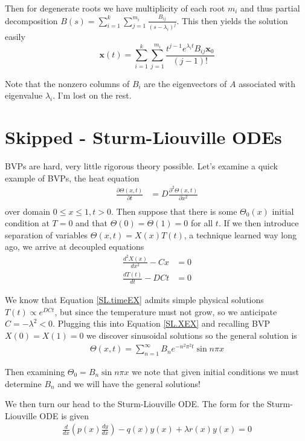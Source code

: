 \documentclass[10pt]{report}
\newcommand{\rtd}[2]{\frac{d^2#1}{d#2^2}}
\newcommand{\ptd}[2]{\frac{\partial^2 #1}{\partial#2^2}}
\newcommand{\rd}[2]{\frac{d#1}{d#2}}
\newcommand{\pd}[2]{\frac{\partial #1}{\partial#2}}
\begin{document}
Then for degenerate roots we have multiplicity of each root $m_{i}$ and thus partial decomposition $B(s) = \sum_{i=1}^k\sum_{j=1}^{m_i}\frac{B_{ij}}{(s-\lambda_i)^j}$. This then yields the solution easily
$$\mathbf{x}(t) = \sum_{i=1}^{k}\sum_{j=1}^{m_i}\frac{t^{j-1}e^{\lambda_it}B_{ij}\mathbf{x}_0}{(j-1)!}$$

Note that the nonzero columns of $B_i$ are the eigenvectors of $A$ associated with eigenvalue $\lambda_i$. I'm lost on the rest.
\chapter{Skipped - Sturm-Liouville ODEs}

BVPs are hard, very little rigorous theory possible. Let's examine a quick example of BVPs, the heat equation
\begin{align}
    \pd{\Theta(x,t)}{t} &= D\ptd{\Theta(x,t)}{x}\\
\end{align}
over domain $0\leq x\leq1, t > 0$. Then suppose that there is some $\Theta_0(x)$ initial condition at $T=0$ and that $\Theta(0) = \Theta(1) = 0$ for all $t$. If we then introduce separation of variables $\Theta(x,t) = X(x) T(t)$, a technique learned way long ago, we arrive at decoupled equations
\begin{align}
    \rtd{X(x)}{x} - Cx &= 0\label{SL.XEX}\\
    \rd{T(t)}{t} - DCt &= 0\label{SL.timeEX}
\end{align}

We know that Equation \ref{SL.timeEX} admits simple physical solutions $T(t) \propto e^{DCt}$, but since the temperature must not grow, so we anticipate $C = -\lambda^2 < 0$. Plugging this into Equation \ref{SL.XEX} and recalling BVP $X(0) = X(1) = 0$ we discover sinusoidal solutions so the general solution is
\begin{align}
    \Theta(x,t) = \sum_{n=1}^{\infty}B_ne^{-n^2\pi^2t}\sin n\pi x
\end{align}

Then examining $\Theta_0 = B_n\sin n\pi x$ we note that given initial conditions we must determine $B_n$ and we will have the general solutions!

We then turn our head to the Sturm-Liouville ODE. The form for the Sturm-Liouville ODE is given
\begin{align}
    \rd{}{x}\left( p(x)\rd{y}{x} \right) - q(x)y(x) + \lambda r(x)y(x) = 0
\end{align}
\end{document}
